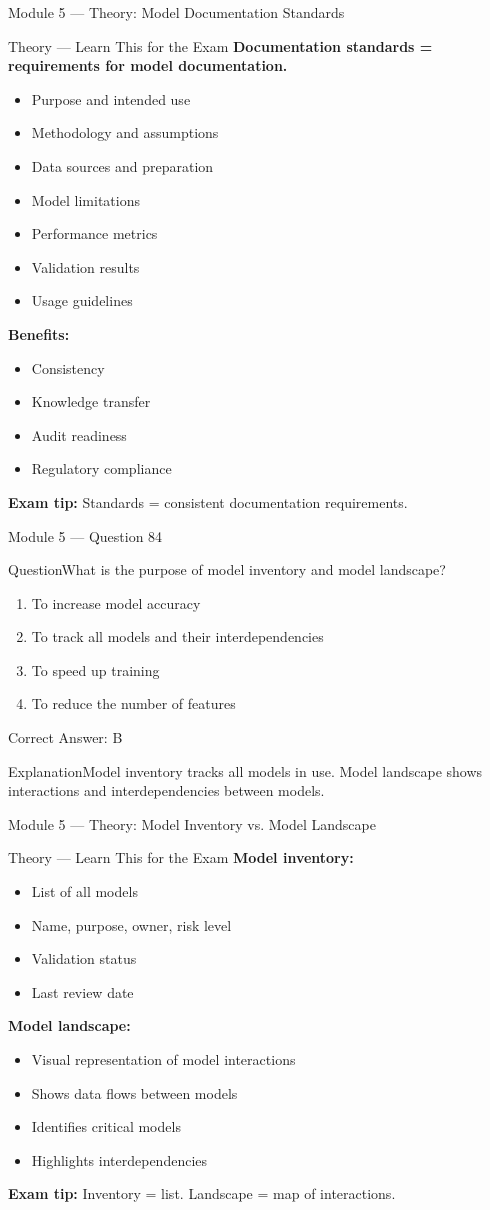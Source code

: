 \documentclass[aspectratio=169,10pt]{beamer}
\newcommand{\question}[1]{\begin{block}{Question}#1\end{block}}
\newcommand{\options}[4]{%
	\begin{enumerate}[label=\Alph*.,leftmargin=*]
		\item #1
		\item #2
		\item #3
		\item #4
	\end{enumerate}
}
\newcommand{\answerbox}[1]{\begin{exampleblock}{Correct Answer: #1}\end{exampleblock}}
\newcommand{\explain}[1]{\begin{block}{Explanation}#1\end{block}}
\newcommand{\theory}[1]{%
	\begin{block}{Theory --- Learn This for the Exam}
		\small #1
	\end{block}
}
\begin{document}
	\begin{frame}{Module 5 --- Theory: Model Documentation Standards}
		\theory{
			\textbf{Documentation standards = requirements for model documentation.}
			\begin{itemize}
				\item Purpose and intended use
				\item Methodology and assumptions
				\item Data sources and preparation
				\item Model limitations
				\item Performance metrics
				\item Validation results
				\item Usage guidelines
			\end{itemize}
			\textbf{Benefits:}
			\begin{itemize}
				\item Consistency
				\item Knowledge transfer
				\item Audit readiness
				\item Regulatory compliance
			\end{itemize}
			\textbf{Exam tip:} Standards = consistent documentation requirements.
		}
	\end{frame}
	
	\begin{frame}{Module 5 --- Question 84}
		\question{What is the purpose of model inventory and model landscape?}
		\options{To increase model accuracy}{To track all models and their interdependencies}{To speed up training}{To reduce the number of features}
		\answerbox{B}
		\explain{Model inventory tracks all models in use. Model landscape shows interactions and interdependencies between models.}
	\end{frame}
	
	\begin{frame}{Module 5 --- Theory: Model Inventory vs. Model Landscape}
		\theory{
			\textbf{Model inventory:}
			\begin{itemize}
				\item List of all models
				\item Name, purpose, owner, risk level
				\item Validation status
				\item Last review date
			\end{itemize}
			\textbf{Model landscape:}
			\begin{itemize}
				\item Visual representation of model interactions
				\item Shows data flows between models
				\item Identifies critical models
				\item Highlights interdependencies
			\end{itemize}
			\textbf{Exam tip:} Inventory = list. Landscape = map of interactions.
		}
	\end{frame}
	
\end{document}
